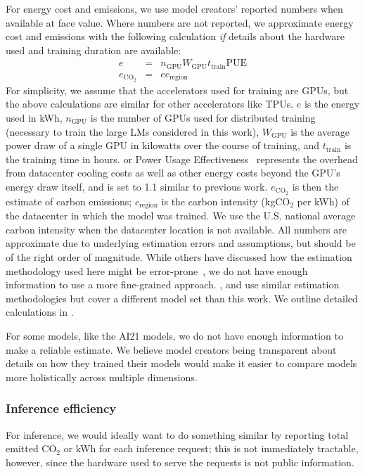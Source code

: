 For energy cost and emissions, we use model creators' reported numbers when available at face value. 
Where numbers are not reported, we approximate energy cost and emissions with the following calculation \emph{if} details about the hardware used and training duration are available:
\begin{eqnarray}
e &=& n_\text{GPU} W_\text{GPU} t_\text{train} \text{PUE} \nonumber \\
e_{\text{CO}_2} &=& e c_\text{region} \nonumber
\end{eqnarray}
For simplicity, we assume that the accelerators used for training are GPUs, but the above calculations are similar for other accelerators like TPUs. $e$ is the energy used in kWh, $n_\text{GPU}$ is the number of GPUs used for distributed training (necessary to train the large LMs considered in this work), $W_\text{GPU}$ is the average power draw of a single GPU in kilowatts over the course of training, and $t_\text{train}$ is the training time in hours.  or Power Usage Effectiveness~\citep{strubell2019energy} represents the overhead from datacenter cooling costs as well as other energy costs beyond the GPU's energy draw itself, and is set to 1.1 similar to previous work. $e_{\text{CO}_2}$ is then the estimate of carbon emissions; $c_\text{region}$ is the carbon intensity (kgCO$_\text{2}$ per kWh) of the datacenter in which the model was trained. We use the U.S. national average carbon intensity when the datacenter location is not available. 
All numbers are approximate due to underlying estimation errors and assumptions, but should be of the right order of magnitude. While others have discussed how the estimation methodology used here might be error-prone~\citep{henderson2020towards,cao2020towards}, we do not have enough information to use a more fine-grained approach.
\citet{strubell2019energy}, \citet{bender2021dangers} and \citet{patterson2021carbon} use similar estimation methodologies but cover a different model set than this work. We outline detailed calculations in .

For some models, like the AI21 models, we do not have enough information to make a reliable estimate. 
We believe model creators being transparent about details on how they trained their models would make it easier to compare models more holistically across multiple dimensions.

\hypertarget{inference-efficiency}{\subsubsection{Inference efficiency}}
For inference, we would ideally want to do something similar by reporting total emitted CO$_\text{2}$ or kWh for each inference request; this is not immediately tractable, however, since the hardware used to serve the requests is not public information.

